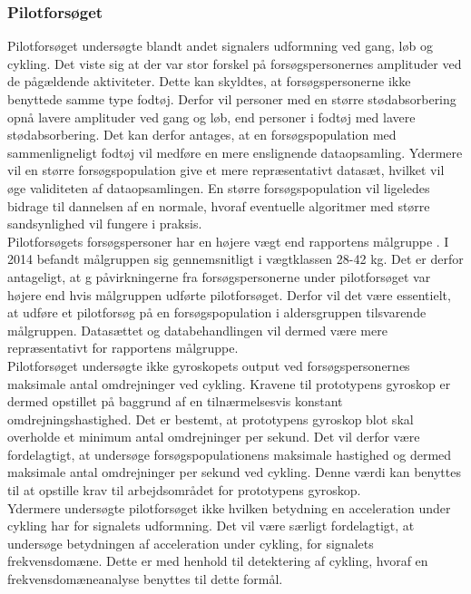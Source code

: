 \subsubsection{Pilotforsøget}
Pilotforsøget undersøgte blandt andet signalers udformning ved gang, løb og cykling. Det viste sig at der var stor forskel på forsøgspersonernes amplituder ved de pågældende aktiviteter. Dette kan skyldtes, at forsøgspersonerne ikke benyttede samme type fodtøj. Derfor vil personer med en større stødabsorbering opnå lavere amplituder ved gang og løb, end personer i fodtøj med lavere stødabsorbering. Det kan derfor antages, at en forsøgspopulation med sammenligneligt fodtøj vil medføre en mere enslignende dataopsamling. Ydermere vil en større forsøgspopulation give et mere repræsentativt datasæt, hvilket vil øge validiteten af dataopsamlingen. En større forsøgspopulation vil ligeledes bidrage til dannelsen af en normale, hvoraf eventuelle algoritmer med større sandsynlighed vil fungere i praksis.\\
Pilotforsøgets forsøgspersoner har en højere vægt end rapportens målgruppe \citep{Rigsholspitalet2014}. I 2014 befandt målgruppen sig gennemsnitligt i vægtklassen 28-42 kg. Det er derfor antageligt, at g påvirkningerne fra forsøgspersonerne under pilotforsøget var højere end hvis målgruppen udførte pilotforsøget. Derfor vil det være essentielt, at udføre et pilotforsøg på en forsøgspopulation i aldersgruppen tilsvarende målgruppen. Datasættet og databehandlingen vil dermed være mere repræsentativt for rapportens målgruppe.\\
Pilotforsøget undersøgte ikke gyroskopets output ved forsøgspersonernes maksimale antal omdrejninger ved cykling. Kravene til prototypens gyroskop er dermed opstillet på baggrund af en tilnærmelsesvis konstant omdrejningshastighed. Det er bestemt, at prototypens gyroskop blot skal overholde et minimum antal omdrejninger per sekund. Det vil derfor være fordelagtigt, at undersøge forsøgspopulationens maksimale hastighed og dermed maksimale antal omdrejninger per sekund ved cykling. Denne værdi kan benyttes til at opstille krav til arbejdsområdet for prototypens gyroskop.\\
Ydermere undersøgte pilotforsøget ikke hvilken betydning en acceleration under cykling har for signalets udformning. Det vil være særligt fordelagtigt, at undersøge betydningen af acceleration under cykling, for signalets frekvensdomæne. Dette er med henhold til detektering af cykling, hvoraf en frekvensdomæneanalyse benyttes til dette formål.

